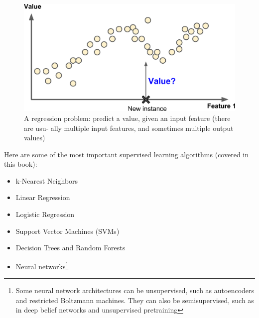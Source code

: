 \begin{figure}
\centering
\includegraphics{img/A regression problem predict a value, given an input feature.png}
\caption{A regression problem: predict a value, given an input feature (there are usu‐
ally multiple input features, and sometimes multiple output values)}
\label{A regression problem predict a value, given an input feature}
\end{figure}

Here are some of the most important supervised learning algorithms (covered in this
book):
\begin{itemize}
\item
k-Nearest Neighbors
\item Linear Regression
\item Logistic Regression
\item Support Vector Machines (SVMs)
\item Decision Trees and Random Forests
\item Neural networks\footnote{Some neural network architectures can be unsupervised, such as autoencoders and restricted Boltzmann
machines. They can also be semisupervised, such as in deep belief networks and unsupervised pretraining}
\end{itemize}
